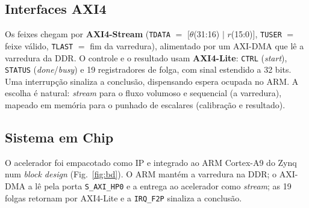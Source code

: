 \documentclass[conference]{IEEEtran}
\begin{document}
\subsection{Interfaces AXI4}

Os feixes chegam por \textbf{AXI4-Stream} (\texttt{TDATA} $=$ [$\theta$(31:16) $|$
$r$(15:0)], \texttt{TUSER} $=$ feixe v\'alido, \texttt{TLAST} $=$ fim da
varredura), alimentado por um AXI-DMA que l\^e a varredura da DDR. O controle e o
resultado usam \textbf{AXI4-Lite}: \texttt{CTRL} (\emph{start}), \texttt{STATUS}
(\emph{done}/\emph{busy}) e \num{19} registradores de folga, com sinal estendido a
\num{32} bits. Uma interrup\c{c}\~ao sinaliza a conclus\~ao, dispensando espera
ocupada no ARM. A escolha \'e natural: \emph{stream} para o fluxo volumoso e
sequencial (a varredura), mapeado em mem\'oria para o punhado de escalares
(calibra\c{c}\~ao e resultado).

\subsection{Sistema em Chip}

O acelerador foi empacotado como IP e integrado ao ARM Cortex-A9 do Zynq num
\emph{block design} (Fig.~\ref{fig:bd}). O ARM mant\'em a varredura na DDR; o
AXI-DMA a l\^e pela porta \texttt{S\_AXI\_HP0} e a entrega ao acelerador como
\emph{stream}; as \num{19} folgas retornam por AXI4-Lite e a
\texttt{IRQ\_F2P} sinaliza a conclus\~ao.
\end{document}

